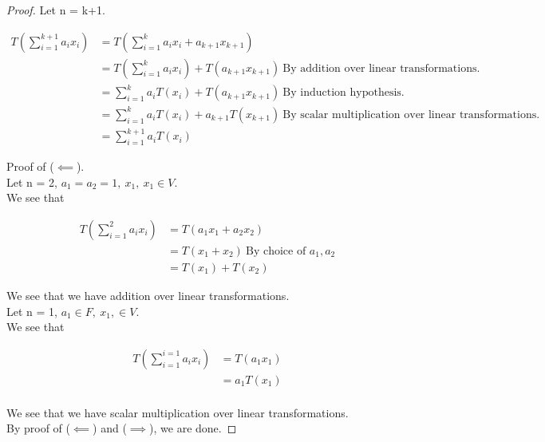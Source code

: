 \documentclass[12pt]{article}
\newenvironment{exercise}[2][Exercise]{\begin{trivlist}
\item[\hskip \labelsep{\bfseries #1}\hskip \labelsep{\bfseries #2.}]}{\end{trivlist}}
\begin{document}
\begin{exercise}{2.1.7}
\begin{proof}
        \noindent Let n = k+1.

        \begin{align*}
            T(\sum_{i=1}^{k+1} a_i x_i)
            & = T(\sum_{i=1}^{k} a_i x_i + a_{k+1} x_{k+1}) \\
            & = T(\sum_{i=1}^{k} a_i x_i) + T(a_{k+1} x_{k+1})\ \text{By addition over linear transformations.} \\
            & = \sum_{i=1}^{k} a_i T(x_i) + T(a_{k+1} x_{k+1})\ \text{By induction hypothesis.} \\
            & = \sum_{i=1}^{k} a_i T(x_i) + a_{k+1} T(x_{k+1})\ \text{By scalar multiplication over linear transformations.} \\
            & = \sum_{i=1}^{k+1} a_i T(x_i)
        \end{align*}

        \noindent Proof of ($\impliedby$). \\

        \noindent Let n = 2, $a_1 = a_2 = 1,\ x_1,\ x_1 \in V$. \\
        We see that 
        
        \begin{align*}
            T(\sum_{i=1}^{2} a_i x_i)
            & = T(a_1 x_1 + a_2 x_2) \\
            & = T(x_1 + x_2)\ \text{By choice of $a_1, a_2$} \\
            & = T(x_1) + T(x_2)
        \end{align*}

        \noindent We see that we have addition over linear transformations. \\

        \noindent Let n = 1, $a_1 \in F,\ x_1, \in V$. \\
        We see that 
        
        \begin{align*}
            T(\sum_{i=1}^{i=1} a_i x_i)
            & = T(a_1 x_1) \\
            & = a_1T(x_1) \\
        \end{align*}

        \noindent We see that we have scalar multiplication over linear transformations. \\

        \noindent By proof of ($\impliedby$) and ($\implies$), we are done.

    \end{proof}

\end{exercise}
\end{document}
